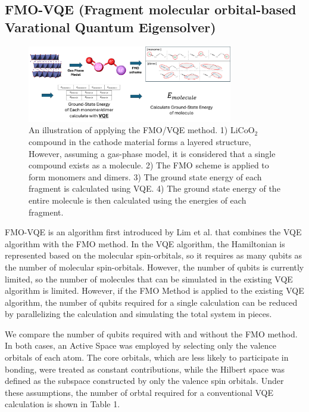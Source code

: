 \documentclass[pdflatex,sn-mathphys-num]{sn-jnl}%
\theoremstyle{thmstyleone}%
\theoremstyle{thmstyletwo}%
\theoremstyle{thmstylethree}%
\begin{document}
\subsection{FMO-VQE (Fragment molecular orbital-based Varational Quantum Eigensolver)}\label{subsec2.4}
\begin{figure}[H]
\centering
\includegraphics[width=0.8\textwidth]{fig/FMO_VQE_schme.png}
\caption{An illustration of applying the FMO/VQE method. 1) \(\mathrm{LiCoO_2}\) compound in the cathode material forms a layered structure, However, assuming a gas-phase model, it is considered that a single compound exists as a molecule. 2) The FMO scheme is applied to form monomers and dimers. 3) The ground state energy of each fragment is calculated using VQE. 4) The ground state energy of the entire molecule is then calculated using the energies of each fragment.}\label{Fig.5}
\end{figure}
FMO-VQE is an algorithm first introduced by Lim et al. that combines the VQE algorithm with the FMO method. In the VQE algorithm, the Hamiltonian is represented based on the molecular spin-orbitals, so it requires as many qubits as the number of molecular spin-orbitals. However, the number of qubits is currently limited, so the number of molecules that can be simulated in the existing VQE algorithm is limited. However, if the FMO Method is applied to the existing VQE algorithm, the number of qubits required for a single calculation can be reduced by parallelizing the calculation and simulating the total system in pieces. 

We compare the number of qubits required with and without the FMO method. 
In both cases, an Active Space was employed by selecting only the valence orbitals of each atom. 
The core orbitals, which are less likely to participate in bonding, were treated as constant contributions, 
while the Hilbert space was defined as the subspace constructed by only the valence spin orbitals. 
Under these assumptions, the number of orbtal required for a conventional VQE calculation is shown in Table 1.
\end{document}
